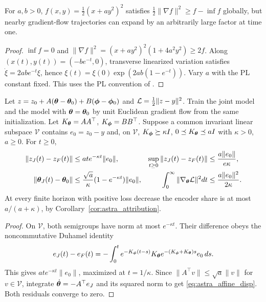 \begin{proposition}
\label{prop:astra_pl_counter}
For $a,b>0$, $f(x,y)=\frac12(x+ay^2)^2$ satisfies
$\frac12\|\nabla f\|^2\ge f-\inf f$ globally, but nearby gradient-flow
trajectories can expand by an arbitrarily large factor at time one.
\end{proposition}
\begin{proof}
$\inf f=0$ and $\|\nabla f\|^2=(x+ay^2)^2(1+4a^2y^2)\ge2f$.
Along $(x(t),y(t))=(-be^{-t},0)$, transverse linearized variation satisfies
$\dot\xi=2abe^{-t}\xi$, hence
$\xi(t)=\xi(0)\exp(2ab(1-e^{-t}))$. Vary $a$ with the PL constant fixed.
This uses the PL convention of \citet{astra_karimi2016}.
\end{proof}

\begin{theorem}
\label{thm:astra_affine}
Let $z=z_0+A({\boldsymbol{\theta}}-{\boldsymbol{\theta}}_0)+B({\boldsymbol{\phi}}-{\boldsymbol{\phi}}_0)$ and
$\mathcal{L}=\frac12\|z-y\|^2$. Train the joint model and the model with
${\boldsymbol{\theta}}={\boldsymbol{\theta}}_0$ by unit Euclidean gradient flow from the same
initialization. Let $K_{\boldsymbol{\theta}}=AA^\top$, $K_{\boldsymbol{\phi}}=BB^\top$.
Suppose a common invariant linear subspace $\mathcal V$ contains
$e_0=z_0-y$ and, on $\mathcal V$,
$K_{\boldsymbol{\phi}}\succeq\kappa I$, $0\preceq K_{\boldsymbol{\theta}}\preceq aI$ with
$\kappa>0$, $a\ge0$. For $t\ge0$,
\begin{align}
 \|z_J(t)-z_F(t)\|&\le at e^{-\kappa t}\|e_0\|,
 &\sup_{t\ge0}\|z_J(t)-z_F(t)\|&\le\frac{a\|e_0\|}{e\kappa},
 \label{eq:astra_affine_gap}\\
 \|{\boldsymbol{\theta}}_J(t)-{\boldsymbol{\theta}}_0\|&\le
 \frac{\sqrt a}{\kappa}(1-e^{-\kappa t})\|e_0\|,
 &\int_0^\infty\|\nabla_{\boldsymbol{\theta}}\mathcal{L}\|^2dt&\le
 \frac{a\|e_0\|^2}{2\kappa}.\label{eq:astra_affine_disp}
\end{align}
At every finite horizon with positive loss decrease the encoder share
is at most $a/(a+\kappa)$, by Corollary~\ref{cor:astra_attribution}.
\end{theorem}
\begin{proof}
On $\mathcal V$, both semigroups have norm at most $e^{-\kappa t}$.
Their difference obeys the noncommutative Duhamel identity
\[
 e_J(t)-e_F(t)=-\int_0^t e^{-K_{\boldsymbol{\phi}}(t-s)}K_{\boldsymbol{\theta}}
                e^{-(K_{\boldsymbol{\phi}}+K_{\boldsymbol{\theta}})s}e_0\,ds.
\]
This gives $at e^{-\kappa t}\|e_0\|$, maximized at $t=1/\kappa$.
Since $\|A^\top v\|\le\sqrt a\|v\|$ for $v\in\mathcal V$,
integrate $\dot{{\boldsymbol{\theta}}}=-A^\top e_J$ and its squared norm to get
\eqref{eq:astra_affine_disp}. Both residuals converge to zero.
\end{proof}

